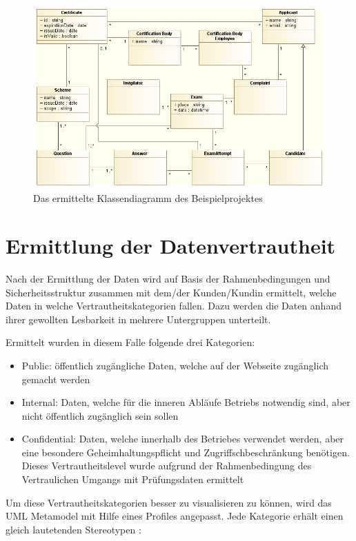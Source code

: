\begin{figure}[H]
    \centering
    \includegraphics[scale=0.5]{uml/class.png}
    \caption{Das ermittelte Klassendiagramm des Beispielprojektes}
\end{figure}

\section{Ermittlung der Datenvertrautheit}
Nach der Ermittlung der Daten wird auf Basis der Rahmenbedingungen und Sicherheitsstruktur zusammen mit dem/der Kunden/Kundin ermittelt, welche Daten in welche Vertrautheitskategorien fallen. Dazu werden die Daten anhand ihrer gewollten Lesbarkeit in mehrere Untergruppen unterteilt.

Ermittelt wurden in diesem Falle folgende drei Kategorien:

\begin{itemize}
  \item Public: öffentlich zugängliche Daten, welche auf der Webseite zugänglich gemacht werden
  \item Internal: Daten, welche für die inneren Abläufe Betriebs notwendig sind, aber nicht öffentlich zugänglich sein sollen
  \item Confidential: Daten, welche innerhalb des Betriebes verwendet werden, aber eine besondere Geheimhaltungspflicht und Zugriffschbeschränkung benötigen. Dieses Vertrautheitslevel wurde aufgrund der Rahmenbedingung des Vertraulichen Umgangs mit Prüfungsdaten ermittelt \cite[7.3]{ISO_CERT}
\end{itemize}

Um diese Vertrautheitskategorien besser zu visualisieren zu können, wird das UML Metamodel mit Hilfe eines Profiles angepasst. Jede Kategorie erhält einen gleich lautetenden Stereotypen \cite[S. 518]{glasklar}:


